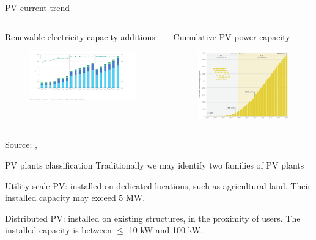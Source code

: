 \documentclass[aspectratio=169, 12pt]{beamer}
\begin{document}
\begin{frame}{PV current trend}
\begin{columns}
  \begin{column}{0.5\columnwidth}
    Renewable electricity capacity additions
    \begin{figure}
    \centering
    \includegraphics[width=0.9\columnwidth]{figure/rec_shares.png}
  \end{figure}
\end{column}
\begin{column}{0.5\columnwidth}
  Cumulative PV power capacity
  \begin{figure}
    \centering
    \includegraphics[width=0.9\columnwidth]{figure/pv_installation.png}
    \end{figure}
  \end{column}
\end{columns}

  {\tiny Source: \cite{irena2019}, \cite{iea2023}}
\end{frame}

\begin{frame}{PV plants classification}
  Traditionally we may identify two families of PV plants

  \textcolor{NTNUBlue}{Utility scale PV}: installed on dedicated locations, such as agricultural land. Their installed capacity may exceed 5 MW.

  \textcolor{NTNUBlue}{Distributed PV}: installed on existing structures, in the proximity of users. The installed capacity is between $\le$ 10 kW and 100 kW.

\end{frame}
\end{document}
